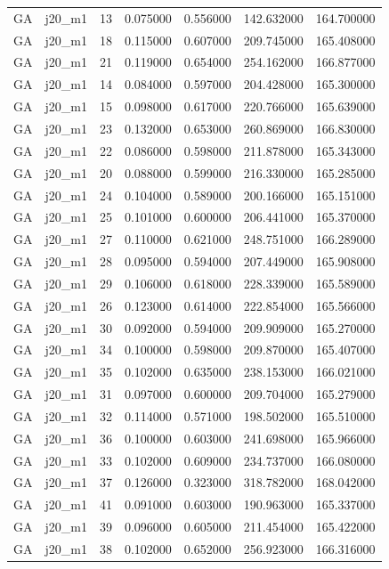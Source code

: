 \begin{tabular}{llrrrrr}
GA & j20_m1 & 13 & 0.075000 & 0.556000 & 142.632000 & 164.700000 \\
GA & j20_m1 & 18 & 0.115000 & 0.607000 & 209.745000 & 165.408000 \\
GA & j20_m1 & 21 & 0.119000 & 0.654000 & 254.162000 & 166.877000 \\
GA & j20_m1 & 14 & 0.084000 & 0.597000 & 204.428000 & 165.300000 \\
GA & j20_m1 & 15 & 0.098000 & 0.617000 & 220.766000 & 165.639000 \\
GA & j20_m1 & 23 & 0.132000 & 0.653000 & 260.869000 & 166.830000 \\
GA & j20_m1 & 22 & 0.086000 & 0.598000 & 211.878000 & 165.343000 \\
GA & j20_m1 & 20 & 0.088000 & 0.599000 & 216.330000 & 165.285000 \\
GA & j20_m1 & 24 & 0.104000 & 0.589000 & 200.166000 & 165.151000 \\
GA & j20_m1 & 25 & 0.101000 & 0.600000 & 206.441000 & 165.370000 \\
GA & j20_m1 & 27 & 0.110000 & 0.621000 & 248.751000 & 166.289000 \\
GA & j20_m1 & 28 & 0.095000 & 0.594000 & 207.449000 & 165.908000 \\
GA & j20_m1 & 29 & 0.106000 & 0.618000 & 228.339000 & 165.589000 \\
GA & j20_m1 & 26 & 0.123000 & 0.614000 & 222.854000 & 165.566000 \\
GA & j20_m1 & 30 & 0.092000 & 0.594000 & 209.909000 & 165.270000 \\
GA & j20_m1 & 34 & 0.100000 & 0.598000 & 209.870000 & 165.407000 \\
GA & j20_m1 & 35 & 0.102000 & 0.635000 & 238.153000 & 166.021000 \\
GA & j20_m1 & 31 & 0.097000 & 0.600000 & 209.704000 & 165.279000 \\
GA & j20_m1 & 32 & 0.114000 & 0.571000 & 198.502000 & 165.510000 \\
GA & j20_m1 & 36 & 0.100000 & 0.603000 & 241.698000 & 165.966000 \\
GA & j20_m1 & 33 & 0.102000 & 0.609000 & 234.737000 & 166.080000 \\
GA & j20_m1 & 37 & 0.126000 & 0.323000 & 318.782000 & 168.042000 \\
GA & j20_m1 & 41 & 0.091000 & 0.603000 & 190.963000 & 165.337000 \\
GA & j20_m1 & 39 & 0.096000 & 0.605000 & 211.454000 & 165.422000 \\
GA & j20_m1 & 38 & 0.102000 & 0.652000 & 256.923000 & 166.316000 \\

\end{tabular}
